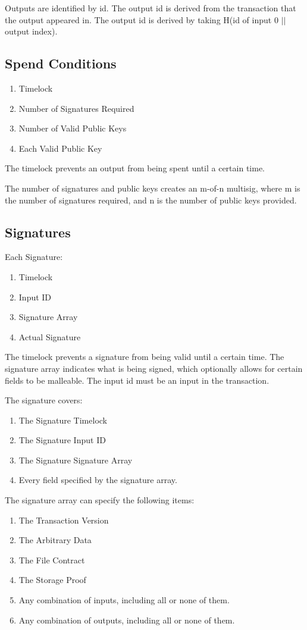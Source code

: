 \documentclass[twocolumn]{article}
\begin{document}
Outputs are identified by id.
The output id is derived from the transaction that the output appeared in.
The output id is derived by taking H(id of input 0 $||$ output index).

\subsection{Spend Conditions}
\begin{enumerate}
	\item Timelock
	\item Number of Signatures Required
	\item Number of Valid Public Keys
	\item Each Valid Public Key
\end{enumerate}

The timelock prevents an output from being spent until a certain time.

The number of signatures and public keys creates an m-of-n multisig, where m is the number of signatures required, and n is the number of public keys provided.

\subsection{Signatures}
Each Signature:
\begin{enumerate}
	\item Timelock
	\item Input ID
	\item Signature Array
	\item Actual Signature
\end{enumerate}

The timelock prevents a signature from being valid until a certain time.
The signature array indicates what is being signed, which optionally allows for certain fields to be malleable.
The input id must be an input in the transaction.

The signature covers:
\begin{enumerate}
	\item The Signature Timelock
	\item The Signature Input ID
	\item The Signature Signature Array
	\item Every field specified by the signature array.
\end{enumerate}

The signature array can specify the following items:
\begin{enumerate}
	\item The Transaction Version
	\item The Arbitrary Data
	\item The File Contract
	\item The Storage Proof
	\item Any combination of inputs, including all or none of them.
	\item Any combination of outputs, including all or none of them.
\end{enumerate}
\end{document}
